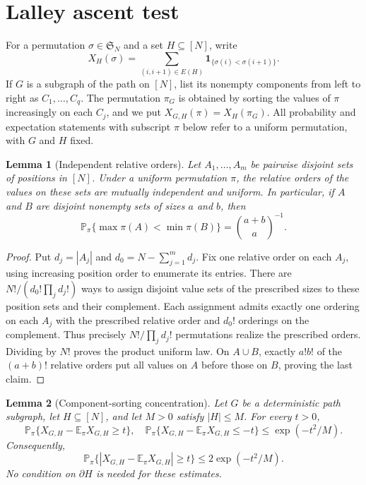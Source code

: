 \documentclass[11pt]{article}
\numberwithin{equation}{section}
\newtheorem{lemma}[lemma]{Lemma}
\newcommand{\E}{\mathbb E}
\newcommand{\Pp}{\mathbb P}
\newcommand{\1}{\mathbf 1}
\begin{document}
\section{Lalley ascent test}

For a permutation \(\sigma\in\mathfrak S_N\) and a set \(H\subseteq[N]\),
write
\[
  X_H(\sigma)=\sum_{(i,i+1)\in E(H)}
                 \1_{\{\sigma(i)<\sigma(i+1)\}}.
\]
If \(G\) is a subgraph of the path on \([N]\), list its nonempty
components from left to right as \(C_1,\ldots,C_q\).  The permutation
\(\pi_G\) is obtained by sorting the values of \(\pi\) increasingly
on each \(C_j\), and we put \(X_{G,H}(\pi)=X_H(\pi_G)\).
All probability and expectation statements with subscript \(\pi\) below
refer to a uniform permutation, with \(G\) and \(H\) fixed.

\begin{lemma}[Independent relative orders]
\label{lem:relative-order-independence}
Let \(A_1,\ldots,A_m\) be pairwise disjoint sets of positions in
\([N]\).  Under a uniform permutation \(\pi\), the relative orders of
the values on these sets are mutually independent and uniform.  In
particular, if \(A\) and \(B\) are disjoint nonempty sets of sizes
\(a\) and \(b\), then
\[
  \Pp_\pi\{\max\pi(A)<\min\pi(B)\}
  =\binom{a+b}{a}^{-1}.
\]
\end{lemma}

\begin{proof}
Put \(d_j=|A_j|\) and \(d_0=N-\sum_{j=1}^m d_j\).  Fix one
relative order on each \(A_j\), using increasing position order to
enumerate its entries.  There are
\(N!/(d_0!\prod_jd_j!)\) ways to assign disjoint value sets of the
prescribed sizes to these position sets and their complement.  Each
assignment admits exactly one ordering on each \(A_j\) with the
prescribed relative order and \(d_0!\) orderings on the complement.
Thus precisely \(N!/\prod_jd_j!\) permutations realize the prescribed
orders.  Dividing by \(N!\) proves the product uniform law.  On
\(A\cup B\), exactly \(a!b!\) of the \((a+b)!\) relative orders
put all values on \(A\) before those on \(B\), proving the last claim.
\end{proof}

\begin{lemma}[Component-sorting concentration]
\label{lem:permutation-bd}
Let \(G\) be a deterministic path subgraph, let \(H\subseteq[N]\),
and let \(M>0\) satisfy \(|H|\le M\).  For every \(t>0\),
\begin{equation}
\label{eq:component-ascent-one-sided}
  \Pp_\pi\{X_{G,H}-\E_\pi X_{G,H}\ge t\},\quad
  \Pp_\pi\{X_{G,H}-\E_\pi X_{G,H}\le-t\}
  \le \exp(-t^2/M).
\end{equation}
Consequently,
\[
  \Pp_\pi\{|X_{G,H}-\E_\pi X_{G,H}|\ge t\}
  \le 2\exp(-t^2/M).
\]
No condition on \(\partial H\) is needed for these estimates.
\end{lemma}
\end{document}
